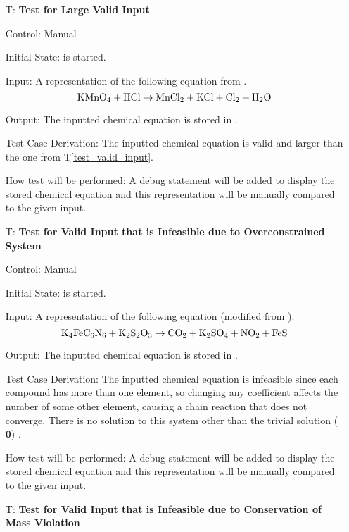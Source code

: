 \documentclass[12pt, titlepage]{article}
\newcounter{testnum} %
\newcommand{\testref}[1]{T\ref{#1}}
\begin{document}
\begin{enumerate}
  \item[T\refstepcounter{testnum}\thetestnum \label{test_large_valid_input}:]
    \textbf{Test for Large Valid Input}

    Control: Manual

    Initial State: \progname{} is started.

    Input: A representation of the following equation from
    \cite{taylor_balancing_2021}.
    $$\ce{KMnO4} + \ce{HCl} \rightarrow \ce{MnCl2} + \ce{KCl} + \ce{Cl2} +
      \ce{H2O}$$

    Output: The inputted chemical equation is stored in \progname{}.

    Test Case Derivation: The inputted chemical equation is
    valid and larger than the one from \testref{test_valid_input}.

    How test will be performed: A debug statement will be added to display the
    stored chemical equation and this representation will be manually compared to
    the given input.

  \item[T\refstepcounter{testnum}\thetestnum \label{test_inf_over_valid_input}:]
    \textbf{Test for Valid Input that is Infeasible due to Overconstrained
      System}

    Control: Manual

    Initial State: \progname{} is started.

    Input: A representation of the following equation (modified from
    \cite{hamid_balancing_2019}).
    $$\ce{K4FeC6N6} + \ce{K2S2O3} \rightarrow \ce{CO2} + \ce{K2SO4} + \ce{NO2} +
      \ce{FeS}$$

    Output: The inputted chemical equation is stored in \progname{}.

    Test Case Derivation: The inputted chemical equation is infeasible since
    each compound has more than one element, so changing any coefficient
    affects the number of some other element, causing a chain reaction that
    does not converge. There is no solution to this system other than the
    trivial solution ($\mathbf{0}$) \cite{hamid_balancing_2019}.

    How test will be performed: A debug statement will be added to display the
    stored chemical equation and this representation will be manually compared to
    the given input.

  \item[T\refstepcounter{testnum}\thetestnum \label{test_inf_cons_mass_valid_input}:]
    \textbf{Test for Valid Input that is Infeasible due to Conservation of Mass
      Violation}


\end{enumerate}
\end{document}
